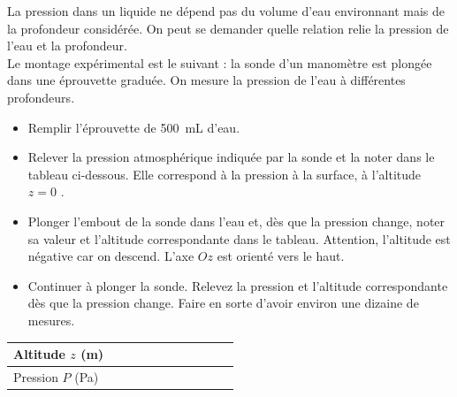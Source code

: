\documentclass[a4paper,11pt,fleqn]{article}%
\begin{document}
	\maketitle
La pression dans un liquide ne dépend pas du volume d’eau environnant mais de la profondeur considérée. On
peut se demander quelle relation relie la pression de l’eau et la profondeur.\\
Le montage expérimental est le suivant : la sonde d’un manomètre est plongée dans une éprouvette graduée.
On mesure la pression de l’eau à différentes profondeurs.

\begin{itemize}
	\item Remplir l’éprouvette de \SI{500}{mL} d’eau.
	\item Relever la pression atmosphérique indiquée par la sonde et la noter dans le tableau ci-dessous. Elle
	correspond à la pression à la surface, à l’altitude $z=0$ .
	\item Plonger l’embout de la sonde dans l’eau et, dès que la pression change, noter sa valeur et l’altitude
	correspondante dans le tableau. Attention, l’altitude est négative car on descend. L’axe $Oz$ est orienté
	vers le haut.
	\item Continuer à plonger la sonde. Relevez la pression et l’altitude correspondante dès que la pression
	change. Faire en sorte d’avoir environ une dizaine de mesures.
\end{itemize}

\begin{center}
	\begin{tabular}{|>{\centering}m{.15\linewidth}|>{\centering}m{.06\linewidth}|>{\centering}m{.06\linewidth}|>{\centering}m{.06\linewidth}|>{\centering}m{.06\linewidth}|>{\centering}m{.06\linewidth}|>{\centering}m{.06\linewidth}|>{\centering}m{.06\linewidth}|>{\centering}m{.06\linewidth}|>{\centering}m{.06\linewidth}|>{\centering\arraybackslash}m{.06\linewidth}|}
		\hline
		Altitude $z$ (\unit{\meter}) & & & & & & & & &&\\
		\hline
		Pression $P$ (\unit{\pascal}) & & & & & & & &&& \\
		\hline
	\end{tabular}
\end{center}
\end{document}
